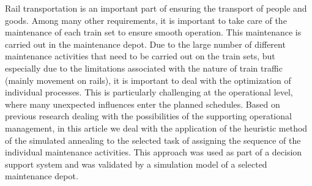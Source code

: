 
\begin{Abstrakt}
    Rail transportation is an important part of ensuring the transport of people and goods. Among many other requirements, it is important to take care of the maintenance of each train set to ensure smooth operation. This maintenance is carried out in the maintenance depot. Due to the large number of different maintenance activities that need to be carried out on the train sets, but especially due to the limitations associated with the nature of train traffic (mainly movement on rails), it is important to deal with the optimization of individual processes. This is particularly challenging at the operational level, where many unexpected influences enter the planned schedules. Based on previous research dealing with the possibilities of the supporting operational management, in this article we deal with the application of the heuristic method of the simulated annealing to the selected task of assigning the sequence of the individual maintenance activities. This approach was used as part of a decision support system and was validated by a simulation model of a selected maintenance depot.
\end{Abstrakt}



\clearpage